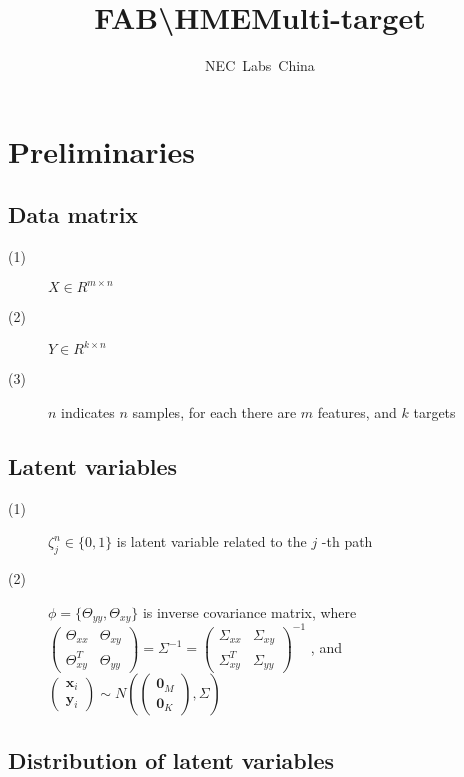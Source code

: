 \documentclass{article}
\begin{document}
\title{FAB\textbackslash HME\quad Multi-target}
\author{NEC\ Labs\ China}
\maketitle

\section{Preliminaries}
\subsection{Data matrix}
\begin{description}
\item[(1)] $X\in R^{m\times n} $
\item[(2)] $Y\in R^{k\times n} $
\item[(3)] $n$ indicates $n$ samples, for each there are $m$ features, and $k$ targets
\end{description}

\subsection{Latent variables}
\begin{description}
\item[(1)] $ \zeta_j^n \in \{ 0,1\} $ is latent variable related to the $j$ -th path
\item[(2)] $ \phi = \{\Theta_{yy} ,\Theta_{xy}\}$ is inverse covariance matrix, 
	where $\begin{pmatrix} 	\Theta_{xx} & \Theta_{xy} \\
		\Theta_{xy}^T & \Theta_{yy}
	\end{pmatrix} = \Sigma^{-1} = \begin{pmatrix}
	\Sigma_{xx} & \Sigma_{xy} \\
	\Sigma_{xy}^T & \Sigma_{yy}
	\end{pmatrix}^{-1}$ , and \\ $ \begin{pmatrix}
	\textbf{x}_i  \\
	\textbf{y}_i 
	\end{pmatrix} \sim N(\begin{pmatrix}
	\textbf{0}_M  \\
	\textbf{0}_K 
	\end{pmatrix}, \Sigma) $
	\end{description}

\subsection{Distribution of latent variables}
\end{document}

